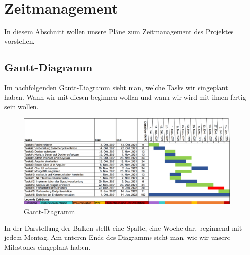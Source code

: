 \section{Zeitmanagement}
In diesem Abschnitt wollen unsere Pläne zum Zeitmanagement des Projektes vorstellen.

\subsection{Gantt-Diagramm}

Im nachfolgenden Gantt-Diagramm sieht man, welche Tasks wir eingeplant haben.
Wann wir mit diesen beginnen wollen und wann wir wird mit ihnen fertig sein wollen.

\begin{figure}[H]
    \centering
    \includegraphics[width=1.0\textwidth]{bilder/zeitmanagement/gantt-diagramm.png}
    \caption{Gantt-Diagramm}
    \label{fig:Gantt-Diagramm}
\end{figure}

\noindent In der Darstellung der Balken stellt eine Spalte, eine Woche dar, beginnend mit jedem Montag.
Am unteren Ende des Diagramms sieht man, wie wir unsere Milestones eingeplant haben.